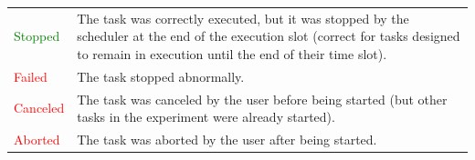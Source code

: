 \documentclass[a4paper,10pt]{article}
\begin{document}
\begin{table}[tp]
\begin{center}
\begin{tabular*}{1\textwidth}{p{}p{}}
			\textcolor{green}{Stopped} & The task was correctly executed, but it was stopped by the scheduler at the end of the execution slot (correct for tasks designed to remain in execution until the end of their time slot).\\
			\textcolor{red}{Failed} & The task stopped abnormally.\\
			\textcolor{red}{Canceled} & The task was canceled by the user before being started (but other tasks in the experiment were already started).\\
			\textcolor{red}{Aborted} & The task was aborted by the user after being started.\\
			\bottomrule
		\end{tabular*}
	\end{center}
\end {table}
\end{document}
